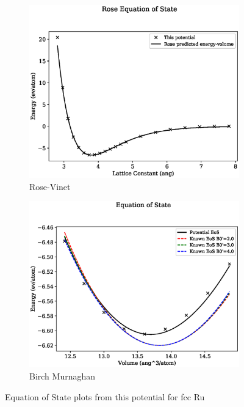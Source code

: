 \begin{figure}[htb]
\begin{subfigure}{.44\textwidth}
  \centering
  \includegraphics[width=.94\linewidth]{chapters/potentials_fe_pd_ru/feru_potential/eos/rose_plot_bp_2.eps}  
  \caption{Rose-Vinet}
  \label{fig:feru-fefcc-rose}
\end{subfigure}
\begin{subfigure}{.44\textwidth}
  \centering
  \includegraphics[width=.94\linewidth]{chapters/potentials_fe_pd_ru/feru_potential/eos/equation_of_state_bp_2.eps}  
  \caption{Birch Murnaghan}
  \label{fig:feru-fefcc-bmeos}
\end{subfigure}
\label{fig:feru-fefcc-equation-of-state}
\caption{Equation of State plots from this potential for \acrshort{fcc} Ru}
\end{figure}


